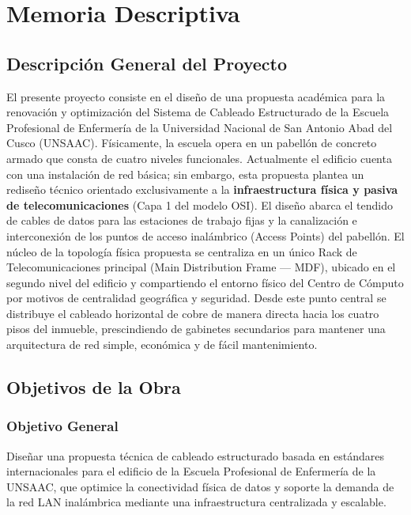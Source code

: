 \newpage
\chapter{Memoria Descriptiva}

\section{Descripción General del Proyecto}
El presente proyecto consiste en el diseño de una propuesta académica para la renovación y optimización del Sistema de Cableado Estructurado de la Escuela Profesional de Enfermería de la Universidad Nacional de San Antonio Abad del Cusco (UNSAAC).
Físicamente, la escuela opera en un pabellón de concreto armado que consta de cuatro niveles funcionales.
Actualmente el edificio cuenta con una instalación de red básica; sin embargo, esta propuesta plantea un rediseño técnico orientado exclusivamente a la \textbf{infraestructura física y pasiva de telecomunicaciones} (Capa 1 del modelo OSI). El diseño abarca el tendido de cables de datos para las estaciones de trabajo fijas y la canalización e interconexión de los puntos de acceso inalámbrico (Access Points) del pabellón.
El núcleo de la topología física propuesta se centraliza en un único Rack de Telecomunicaciones principal (Main Distribution Frame --- MDF), ubicado en el segundo nivel del edificio y compartiendo el entorno físico del Centro de Cómputo por motivos de centralidad geográfica y seguridad.
Desde este punto central se distribuye el cableado horizontal de cobre de manera directa hacia los cuatro pisos del inmueble, prescindiendo de gabinetes secundarios para mantener una arquitectura de red simple, económica y de fácil mantenimiento.

\section{Objetivos de la Obra}

\subsection{Objetivo General}
Diseñar una propuesta técnica de cableado estructurado basada en estándares internacionales para el edificio de la Escuela Profesional de Enfermería de la UNSAAC, que optimice la conectividad física de datos y soporte la demanda de la red LAN inalámbrica mediante una infraestructura centralizada y escalable.

